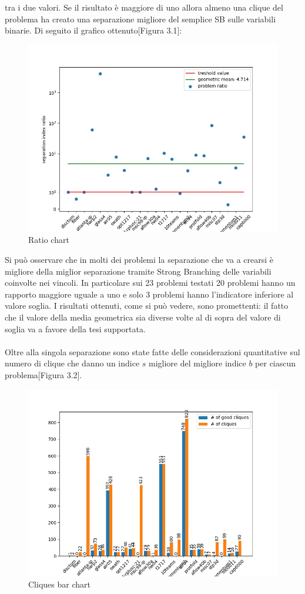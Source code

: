\documentclass[12pt,a4paper,twoside,openright]{book}
\begin{document}
tra i due valori. Se il risultato è maggiore di uno allora almeno una clique del problema ha creato una separazione migliore del semplice SB
sulle variabili binarie. Di seguito il grafico ottenuto[Figura 3.1]:
\begin{figure}[ht]
    \centering
    \includegraphics [scale = 0.64]{chart_agg}
    \caption{Ratio chart}
    \label{fig:ratio}
\end{figure}\clearpage
Si può osservare che in molti dei problemi la separazione che va a crearsi è migliore della miglior separazione 
tramite Strong Branching delle variabili coinvolte nei vincoli. In particolare sui 23 problemi testati
20 problemi hanno un rapporto maggiore uguale a uno e solo 3 problemi hanno l'indicatore inferiore al valore soglia.
I risultati ottenuti, come si può vedere, sono promettenti: il fatto che il valore della media geometrica sia diverse volte
al di sopra del valore di soglia va a favore della tesi supportata. \\\\
Oltre alla singola separazione sono state fatte delle considerazioni quantitative sul numero di clique che danno un 
indice $s$ migliore del migliore indice $b$ per ciascun problema[Figura 3.2].
\begin{figure}[ht]
    \centering
    \includegraphics [scale = 0.65]{chart_agg2}
    \caption{Cliques bar chart}
    \label{fig:ratio}
\end{figure}\\
\end{document}
